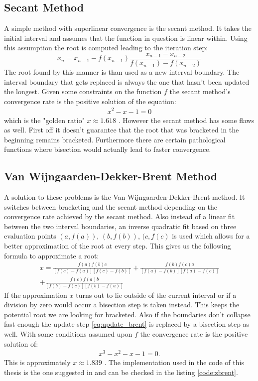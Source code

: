 \documentclass[a4paper, oneside]{thirdparty_stylesheets/discothesis}
\begin{document}
\subsection{Secant Method}
A simple method with superlinear convergence is the secant method. 
It takes the initial interval and assumes that the function in question is linear within.
Using this assumption the root is computed leading to the iteration step:
\begin{equation}
	x_n = x_{n-1} - f(x_{n-1})\frac{x_{n-1}-x_{n-2}}{f(x_{n-1})-f(x_{n-2})}
\end{equation}
The root found by this manner is than used as a new interval boundary.
The interval boundary that gets replaced is always the one that hasn't been updated the longest.
Given some constraints on the function $f$ the secant method's convergence rate is the positive solution of the equation:
\begin{align}
	x^2 -x -1 = 0
\end{align}
which is the "golden ratio" $x \approx 1.618$ \cite{doi:10.1002/9781118033128.ch3}.
However the secant method has some flaws as well.
First off it doesn't guarantee that the root that was bracketed in the beginning remains bracketed.
Furthermore there are certain pathological functions where bisection would actually lead to faster convergence.

\subsection{Van Wijngaarden-Dekker-Brent Method} 
A solution to these problems is the Van Wijngaarden-Dekker-Brent method. 
It switches between bracketing and the secant method depending on the convergence rate achieved by the secant method. 
Also instead of a linear fit between the two interval boundaries, an inverse quadratic fit based on three evaluation points $(a,f(a))$, $(b,f(b))$, $(c, f(c)$ is used which allows for a better approximation of the root at every step.
This gives us the following formula to approximate a root:
\begin{align}
	x  = \frac{f(a)f(b)c}{[f(c)-f(a)][f(c)-f(b)]} + \frac{f(b)f(c)a}{[f(a)-f(b)][f(a)-f(c)]} \\
	+\frac{f(c)f(a)b}{[f(b)-f(c)][f(b)-f(a)]} \label{eq:update_brent}
\end{align}
If the approximation $x$ turns out to lie outside of the current interval or if a division by zero would occur a bisection step is taken instead.
This keeps the potential root we are looking for bracketed.
Also if the boundaries don't collapse fast enough the update step \ref{eq:update_brent} is replaced by a bisection step as well.
With some conditions assumed upon $f$ the convergence rate is the positive solution of:
\begin{align}
	x^3 - x^2 - x -1 = 0.
\end{align}
This is approximately $x \approx 1.839$ \cite{brent1971algorithms}.
The implementation used in the code of this thesis is the one suggested in \cite{rf}
and can be checked in the listing \ref{code:zbrent}.
\end{document}
